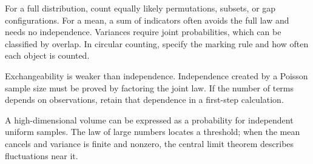 For a full distribution, count equally likely permutations, subsets, or gap configurations. For a mean, a sum of indicators often avoids the full law and needs no independence. Variances require joint probabilities, which can be classified by overlap. In circular counting, specify the marking rule and how often each object is counted.

Exchangeability is weaker than independence. Independence created by a Poisson sample size must be proved by factoring the joint law. If the number of terms depends on observations, retain that dependence in a first-step calculation.

A high-dimensional volume can be expressed as a probability for independent uniform samples. The law of large numbers locates a threshold; when the mean cancels and variance is finite and nonzero, the central limit theorem describes fluctuations near it.
\par\smallskip
